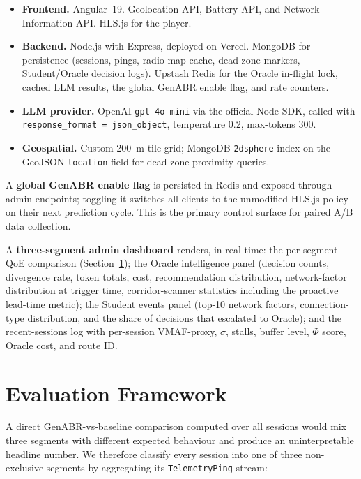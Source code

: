 \documentclass[conference]{IEEEtran}
\begin{document}
\begin{itemize}
  \item \textbf{Frontend.} Angular~19. Geolocation API, Battery API,
        and Network Information API. HLS.js for the player.
  \item \textbf{Backend.} Node.js with Express, deployed on Vercel.
        MongoDB for persistence (sessions, pings, radio-map cache,
        dead-zone markers, Student/Oracle decision logs). Upstash Redis
        for the Oracle in-flight lock, cached LLM results, the global
        GenABR enable flag, and rate counters.
  \item \textbf{LLM provider.} OpenAI \texttt{gpt-4o-mini} via the
        official Node SDK, called with \texttt{response\_format =
        json\_object}, temperature 0.2, max-tokens 300.
  \item \textbf{Geospatial.} Custom 200~m tile grid; MongoDB
        \texttt{2dsphere} index on the GeoJSON \texttt{location} field
        for dead-zone proximity queries.
\end{itemize}

A \textbf{global GenABR enable flag} is persisted in Redis and exposed
through admin endpoints; toggling it switches all clients to the
unmodified HLS.js policy on their next prediction cycle. This is the
primary control surface for paired A/B data collection.

A \textbf{three-segment admin dashboard} renders, in real time: the
per-segment QoE comparison (Section~\ref{sec:eval}); the Oracle
intelligence panel (decision counts, divergence rate, token totals,
cost, recommendation distribution, network-factor distribution at
trigger time, corridor-scanner statistics including the proactive
lead-time metric); the Student events panel (top-10 network factors,
connection-type distribution, and the share of decisions that escalated
to Oracle); and the recent-sessions log with per-session VMAF-proxy,
$\sigma$, stalls, buffer level, $\Phi$ score, Oracle cost, and route ID.

\section{Evaluation Framework}
\label{sec:eval}
A direct GenABR-vs-baseline comparison computed over all sessions would
mix three segments with different expected behaviour and produce an
uninterpretable headline number. We therefore classify every session
into one of three non-exclusive segments by aggregating its
\texttt{TelemetryPing} stream:
\end{document}

